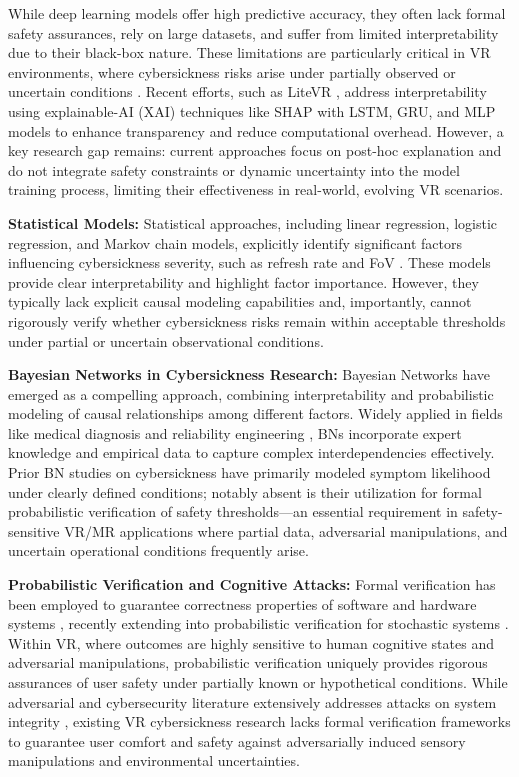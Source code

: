 \documentclass{vgtc}                          %
\begin{document}
While deep learning models offer high predictive accuracy, they often lack formal safety assurances, rely on large datasets, and suffer from limited interpretability due to their black-box nature. These limitations are particularly critical in VR environments, where cybersickness risks arise under partially observed or uncertain conditions \cite{Kundu9995115}. Recent efforts, such as LiteVR \cite{Kundu10108450}, address interpretability using explainable-AI (XAI) techniques like SHAP with LSTM, GRU, and MLP models to enhance transparency and reduce computational overhead. However, a key research gap remains: current approaches focus on post-hoc explanation and do not integrate safety constraints or dynamic uncertainty into the model training process, limiting their effectiveness in real-world, evolving VR scenarios.

\textbf{Statistical Models:}
Statistical approaches, including linear regression, logistic regression, and Markov chain models, explicitly identify significant factors influencing cybersickness severity, such as refresh rate and FoV \cite{Campos2021, Smith10453565}. These models provide clear interpretability and highlight factor importance. However, they typically lack explicit causal modeling capabilities and, importantly, cannot rigorously verify whether cybersickness risks remain within acceptable thresholds under partial or uncertain observational conditions.

\textbf{Bayesian Networks in Cybersickness Research:}
Bayesian Networks have emerged as a compelling approach, combining interpretability and probabilistic modeling of causal relationships among different factors. Widely applied in fields like medical diagnosis and reliability engineering \cite{yang2022machine}, BNs incorporate expert knowledge and empirical data to capture complex interdependencies effectively. Prior BN studies on cybersickness have primarily modeled symptom likelihood under clearly defined conditions\cite{Smith10453565}; notably absent is their utilization for formal probabilistic verification of safety thresholds—an essential requirement in safety-sensitive VR/MR applications where partial data, adversarial manipulations, and uncertain operational conditions frequently arise.

\textbf{Probabilistic Verification and Cognitive Attacks:}
Formal verification has been employed to guarantee correctness properties of software and hardware systems \cite{murray2013sel4, leroy2009formal, jiang2012cyber, kern1999formal}, recently extending into probabilistic verification for stochastic systems \cite{junges2016probabilistic}. Within VR, where outcomes are highly sensitive to human cognitive states and adversarial manipulations, probabilistic verification uniquely provides rigorous assurances of user safety under partially known or hypothetical conditions. While adversarial and cybersecurity literature extensively addresses attacks on system integrity \cite{li2024comprehensive}, existing VR cybersickness research lacks formal verification frameworks to guarantee user comfort and safety against adversarially induced sensory manipulations and environmental uncertainties.
\end{document}
